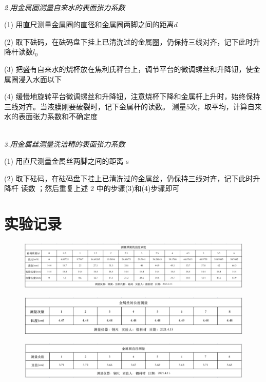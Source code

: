 \documentclass[UTF8]{ctexart}
\begin{document}
    \emph{\\[0.02cm]2.用金属圈测量自来水的表面张力系数}

    (1) 用直尺测量金属圈的直径和金属圈两脚之间的距离$d$

    (2) 取下砝码，在砝码盘下挂上已清洗过的金属圈，仍保持三线对齐，记下此时升降杆读数$l_0$

    (3) 把盛有自来水的烧杯放在焦利氏秤台上，调节平台的微调螺丝和升降钮，使金属圈浸入水面以下

    (4) 缓慢地旋转平台微调螺丝和升降钮，注意烧杯下降和金属杆上升时，始终保持三线对齐。当液膜刚要破裂时，记下金属杆的读数。
    测量$5$次，取平均，计算自来水的表面张力系数和不确定度

    \emph{\\[0.02cm]3.用金属丝测量洗洁精的表面张力系数}

    (1) 用直尺测量金属丝两脚之间的距离 s

    (2) 取下砝码，在砝码盘下挂上已清洗过的金属丝，仍保持三线对齐，记下此时升降杆
    读数 ；然后重复上述 2 中的步骤(3)和(4)步骤即可

    

    \section{实验记录}

    \begin{figure}[ht]
        \centering 
        \includegraphics[width=16cm]{劲度系数.png}
    \end{figure} 

    \begin{figure}[ht]
        \centering 
        \includegraphics[width=14cm]{金属丝长度.png}
    \end{figure} 

    \begin{figure}[ht]
        \centering 
        \includegraphics[width=14cm]{金属圈直径.png}
    \end{figure}
\end{document}
